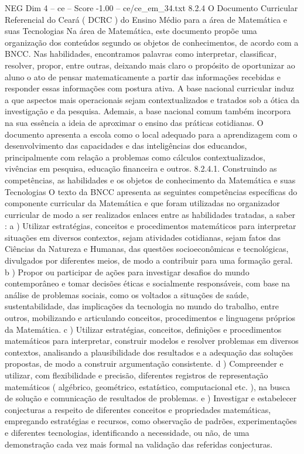 \begin{textsample}{NEG Dim 4 – ce – Score -1.00 – ce/ce\_em\_34.txt}  \label{ex:f4_neg_157}
8.2.4 O Documento Curricular Referencial do Ceará ( DCRC ) do Ensino Médio para a área de Matemática e suas Tecnologias Na área de Matemática, este documento propõe uma organização dos conteúdos segundo os objetos de conhecimentos, de acordo com a BNCC.
Nas habilidades, encontramos palavras como interpretar, classificar, resolver, propor, entre outras, deixando mais claro o propósito de oportunizar ao aluno o ato de pensar matematicamente a partir das informações recebidas e responder essas informações com postura ativa.
A base nacional curricular induz a que aspectos mais operacionais sejam contextualizados e tratados sob a ótica da investigação e da pesquisa.
Ademais, a base nacional comum também incorpora na sua essência a ideia de aproximar o ensino das práticas cotidianas.
O documento apresenta a escola como o local adequado para a aprendizagem com o desenvolvimento das capacidades e das inteligências dos educandos, principalmente com relação a problemas como cálculos contextualizados, vivências em pesquisa, educação financeira e outros. 8.2.4.1.
Construindo as competências, as habilidades e os objetos de conhecimento da Matemática e suas Tecnologias O texto da BNCC apresenta as seguintes competências específicas do componente curricular da Matemática e que foram utilizadas no organizador curricular de modo a ser realizados enlaces entre as habilidades tratadas, a saber : a ) Utilizar estratégias, conceitos e procedimentos matemáticos para interpretar situações em diversos contextos, sejam atividades cotidianas, sejam fatos das Ciências da Natureza e Humanas, das questões socioeconômicas e tecnológicas, divulgados por diferentes meios, de modo a contribuir para uma formação geral. b ) Propor ou participar de ações para investigar desafios do mundo contemporâneo e tomar decisões éticas e socialmente responsáveis, com base na análise de problemas sociais, como os voltados a situações de saúde, sustentabilidade, das implicações da tecnologia no mundo do trabalho, entre outros, mobilizando e articulando conceitos, procedimentos e linguagens próprios da Matemática. c ) Utilizar estratégias, conceitos, definições e procedimentos matemáticos para interpretar, construir modelos e resolver problemas em diversos contextos, analisando a plausibilidade dos resultados e a adequação das soluções propostas, de modo a construir argumentação consistente. d ) Compreender e utilizar, com flexibilidade e precisão, diferentes registros de representação matemáticos ( algébrico, geométrico, estatístico, computacional etc. ), na busca de solução e comunicação de resultados de problemas. e ) Investigar e estabelecer conjecturas a respeito de diferentes conceitos e propriedades matemáticas, empregando estratégias e recursos, como observação de padrões, experimentações e diferentes tecnologias, identificando a necessidade, ou não, de uma demonstração cada vez mais formal na validação das referidas conjecturas.

\end{textsample}
